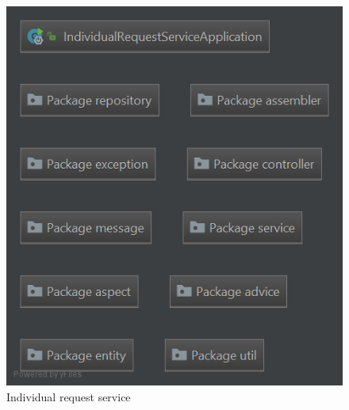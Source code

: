 \begin{figure}[H]
\includegraphics[width=\linewidth]{images/PackageIndividualrequestservice.png}
\caption{ Individual request service }
\label{fig:pkgindividualrequest}
\end{figure}

